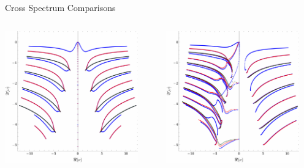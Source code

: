 \documentclass[xcolor=dvipsnames]{beamer}
\begin{document}
\begin{frame}{Cross Spectrum Comparisons}
  \begin{columns}[T]
    \begin{column}{0.5\textwidth}
      \includegraphics[width=0.9\textwidth]{figs/all_sectors_compared_ef_spherical_over_a0.pdf}
    \end{column}

    \begin{column}{0.5\textwidth}
      \includegraphics[width=0.9\textwidth]{figs/all_sectors_compared_ef_spherical_over_a1_2.pdf}
    \end{column}
  \end{columns}


\end{frame}
\end{document}
